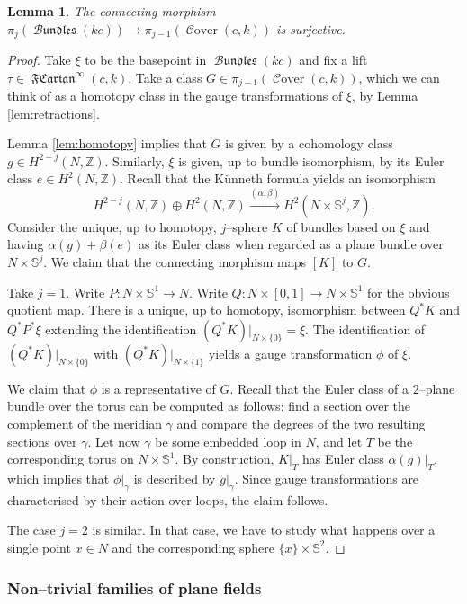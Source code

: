 \documentclass[10pt]{amsart}
\newcommand{\Cover}{\operatorname{\mathcal{C}over}}
\newcommand{\FCartan}{\operatorname{\mathfrak{FCartan}}}
\newcommand{\Bundles}{\operatorname{\mathcal{B}\mathfrak{undles}}}
\newcommand{\Z}{{\mathbb{Z}}}
\newcommand{\NS}{{\mathbb{S}}}
\newtheorem{lemma}{Lemma}
\theoremstyle{definition}
\begin{document}
\begin{lemma} \label{lem:surjectivity}
The connecting morphism $\pi_j(\Bundles(kc)) \to \pi_{j-1}(\Cover(c,k))$ is surjective.
\end{lemma}
\begin{proof}
Take $\xi$ to be the basepoint in $\Bundles(kc)$ and fix a lift $\tau \in \FCartan^\infty(c,k)$. Take a class $G \in \pi_{j-1}(\Cover(c,k))$, which we can think of as a homotopy class in the gauge transformations of $\xi$, by Lemma \ref{lem:retractions}.

Lemma \ref{lem:homotopy} implies that $G$ is given by a cohomology class $g \in H^{2-j}(N,\Z)$. Similarly, $\xi$ is given, up to bundle isomorphism, by its Euler class $e \in H^2(N,\Z)$. Recall that the K\"unneth formula yields an isomorphism
\[ H^{2-j}(N,\Z) \oplus H^2(N,\Z) \overset{(\alpha,\beta)}\longrightarrow H^2(N \times \NS^j, \Z). \]
Consider the unique, up to homotopy, $j$--sphere $K$ of bundles based on $\xi$ and having $\alpha(g) + \beta(e)$ as its Euler class when regarded as a plane bundle over $N \times \NS^j$. We claim that the connecting morphism maps $[K]$ to $G$.

Take $j=1$. Write $P: N \times \NS^1 \to N$. Write $Q: N \times [0,1] \to N \times \NS^1$ for the obvious quotient map. There is a unique, up to homotopy, isomorphism between $Q^*K$ and $Q^*P^*\xi$ extending the identification $(Q^*K)|_{N \times \{0\}} = \xi$. The identification of $(Q^*K)|_{N \times \{0\}}$ with $(Q^*K)|_{N \times \{1\}}$ yields a gauge transformation $\phi$ of $\xi$.

We claim that $\phi$ is a representative of $G$. Recall that the Euler class of a $2$--plane bundle over the torus can be computed as follows: find a section over the complement of the meridian $\gamma$ and compare the degrees of the two resulting sections over $\gamma$. Let now $\gamma$ be some embedded loop in $N$, and let $T$ be the corresponding torus on $N \times \NS^1$. By construction, $K|_T$ has Euler class $\alpha(g)|_T$, which implies that $\phi|_\gamma$ is described by $g|_\gamma$. Since gauge transformations are characterised by their action over loops, the claim follows.

The case $j=2$ is similar. In that case, we have to study what happens over a single point $x \in N$ and the corresponding sphere $\{x\} \times \NS^2$. 
\end{proof}


\subsubsection{Non--trivial families of plane fields} \label{ssec:nonTrivialPlanes}
\end{document}
